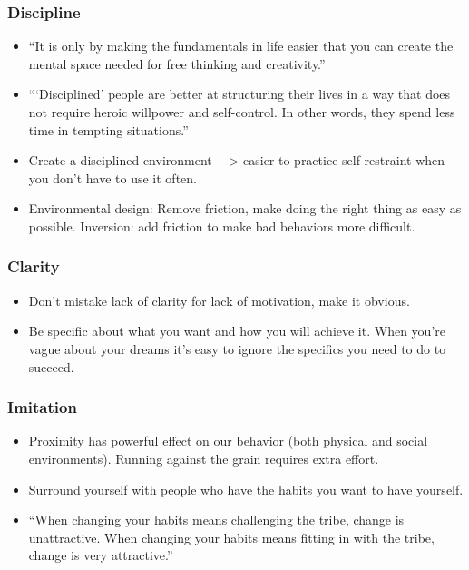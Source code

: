 \begin{frame}[fragile]\frametitle{Discipline}
\begin{itemize}
\item ``It is only by making the fundamentals in life easier that you can create the mental space needed for free thinking and creativity.'' 
\item ``‘Disciplined’ people are better at structuring their lives in a way that does not require heroic willpower and self-control. In other words, they spend less time in tempting situations.'' 
\item Create a disciplined environment —> easier to practice self-restraint when you don’t have to use it often. 
\item Environmental design: Remove friction, make doing the right thing as easy as possible. Inversion: add friction to make bad behaviors more difficult. 
\end{itemize}
\end{frame}

\begin{frame}[fragile]\frametitle{Clarity}
\begin{itemize}
\item Don’t mistake lack of clarity for lack of motivation, make it obvious. 
\item Be specific about what you want and how you will achieve it. When you’re vague about your dreams it’s easy to ignore the specifics you need to do to succeed. 
\end{itemize}
\end{frame}

\begin{frame}[fragile]\frametitle{Imitation}
\begin{itemize}
\item Proximity has powerful effect on our behavior (both physical and social environments). Running against the grain requires extra effort. 
\item Surround yourself with people who have the habits you want to have yourself. 
\item ``When changing your habits means challenging the tribe, change is unattractive. When changing your habits means fitting in with the tribe, change is very attractive.'' 
\end{itemize}
\end{frame}


